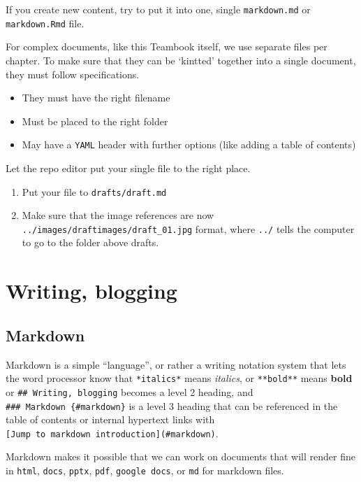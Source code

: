 \documentclass[
  a4paper,
  openany, a4paper, oneside]{book}
\providecommand{\tightlist}{%
  \setlength{\itemsep}{0pt}\setlength{\parskip}{0pt}}
\begin{document}
If you create new content, try to put it into one, single \texttt{markdown.md} or \texttt{markdown.Rmd} file.

For complex documents, like this Teambook itself, we use separate files per chapter. To make sure that they can be `kintted' together into a single document, they must follow specifications.

\begin{itemize}
\tightlist
\item
  They must have the right filename
\item
  Must be placed to the right folder
\item
  May have a \texttt{YAML} header with further options (like adding a table of contents)
\end{itemize}

Let the repo editor put your single file to the right place.

\begin{enumerate}
\def\labelenumi{\arabic{enumi}.}
\tightlist
\item
  Put your file to \texttt{drafts/draft.md}
\item
  Make sure that the image references are now \texttt{../images/draftimages/draft\_01.jpg} format, where \texttt{../} tells the computer to go to the folder above drafts.
\end{enumerate}

\hypertarget{writing-blogging}{%
\section{Writing, blogging}\label{writing-blogging}}

\hypertarget{markdown}{%
\subsection{Markdown}\label{markdown}}

Markdown is a simple ``language'', or rather a writing notation system that lets the word processor know that \texttt{*italics*} means \emph{italics}, or \texttt{**bold**} means \textbf{bold} or \texttt{\#\#\ Writing,\ blogging} becomes a level 2 heading, and \texttt{\#\#\#\ Markdown\ \{\#markdown\}} is a level 3 heading that can be referenced in the table of contents or internal hypertext links with \texttt{{[}Jump\ to\ markdown\ introduction{]}(\#markdown)}.

Markdown makes it possible that we can work on documents that will render fine in \texttt{html}, \texttt{docs}, \texttt{pptx}, \texttt{pdf}, \texttt{google\ docs}, or \texttt{md} for markdown files.
\end{document}
